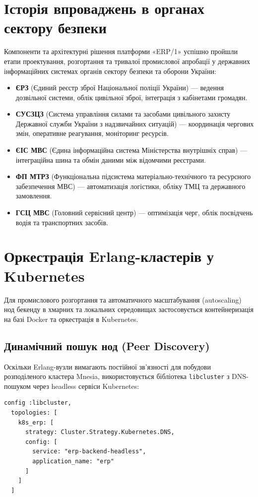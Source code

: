 \documentclass{article}
\begin{document}
\section{Історія впроваджень в органах сектору безпеки}
Компоненти та архітектурні рішення платформи «ERP/1» успішно пройшли етапи проектування, розгортання та тривалої промислової апробації у державних інформаційних системах органів сектору безпеки та оборони України:
\begin{itemize}
    \item \textbf{ЄРЗ} (Єдиний реєстр зброї Національної поліції України) --- ведення дозвільної системи, облік цивільної зброї, інтеграція з кабінетами громадян.
    \item \textbf{СУСЗЦЗ} (Система управління силами та засобами цивільного захисту Державної служби України з надзвичайних ситуацій) --- координація чергових змін, оперативне реагування, моніторинг ресурсів.
    \item \textbf{ЄІС МВС} (Єдина інформаційна система Міністерства внутрішніх справ) --- інтеграційна шина та обмін даними між відомчими реєстрами.
    \item \textbf{ФП МТРЗ} (Функціональна підсистема матеріально-технічного та ресурсного забезпечення МВС) --- автоматизація логістики, обліку ТМЦ та державного замовлення.
    \item \textbf{ГСЦ МВС} (Головний сервісний центр) --- оптимізація черг, облік посвідчень водія та транспортних засобів.
\end{itemize}

\section{Оркестрація Erlang-кластерів у Kubernetes}
 
Для промислового розгортання та автоматичного масштабування (autoscaling) нод бекенду в хмарних та локальних середовищах застосовується контейнеризація на базі Docker та оркестрація в Kubernetes.

\subsection{Динамічний пошук нод (Peer Discovery)}
Оскільки Erlang-вузли вимагають постійної зв'язності для побудови розподіленого кластера Mnesia, використовується бібліотека \texttt{libcluster} з DNS-пошуком через headless сервіси Kubernetes:
\begin{lstlisting}
config :libcluster,
  topologies: [
    k8s_erp: [
      strategy: Cluster.Strategy.Kubernetes.DNS,
      config: [
        service: "erp-backend-headless",
        application_name: "erp"
      ]
    ]
  ]
\end{lstlisting}
\end{document}
